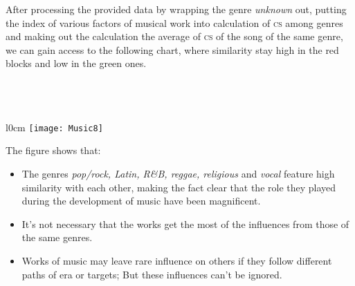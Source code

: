 \documentclass[12pt]{article}
\begin{document}
{{After processing the provided data by wrapping the genre {\textit{unknown}} out, putting the index of various factors of musical work into calculation of {\textsc{cs}} among genres and making out the calculation the average of {\textsc{cs}} of the song of the same genre, we can gain access to the following chart, where similarity stay high in the red blocks and low in the green ones.
\\\\\\\
\begin{wrapfigure}{l}{0cm}
\texttt{[image: Music8]}	
\end{wrapfigure}

The figure shows that:
\begin{itemize}
	\item The genres {\textit{pop/rock, Latin, R\&B, reggae, religious}} and {\textit{vocal}} feature high similarity with each other, making the fact clear that the role they played during the development of music have been magnificent.
	\item It's not necessary that the works get the most of the influences from those of the same genres.
	\item Works of music may leave rare influence on others if they follow different paths of era or targets; But these influences can't be ignored.\\\\\\\\\\\\
\end{itemize}
}}
\end{document}
